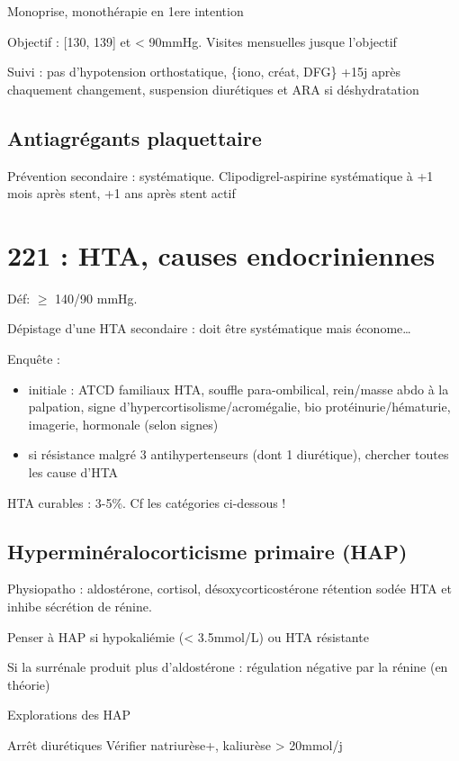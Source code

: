 \documentclass[11pt]{article}
\begin{document}
Monoprise, monothérapie en 1ere intention

Objectif : [130, 139] et < 90mmHg. Visites mensuelles jusque l'objectif

Suivi : pas d'hypotension orthostatique, \{iono, créat, DFG\} +15j après
chaquement changement, suspension diurétiques et ARA si déshydratation

\subsection{Antiagrégants plaquettaire}
\label{sec:org9f45f68}
Prévention secondaire : systématique. Clipodigrel-aspirine systématique à +1 mois
après stent, +1 ans après stent actif

\section{221 : HTA, causes endocriniennes}
\label{sec:org1f9e0af}
Déf: \(\ge\) 140/90 mmHg.

Dépistage d'une HTA secondaire : doit être systématique mais économe\ldots{}

Enquête :
\begin{itemize}
\item initiale : ATCD familiaux HTA, souffle para-ombilical, rein/masse abdo à la
palpation, signe d'hypercortisolisme/acromégalie, bio \thus
protéinurie/hématurie, imagerie, hormonale (selon signes)
\item si résistance malgré 3 antihypertenseurs (dont 1 diurétique), chercher toutes
les cause d'HTA
\end{itemize}

HTA curables : 3-5\%. Cf les catégories ci-dessous !

\subsection{Hyperminéralocorticisme primaire (HAP)}
\label{sec:org8506369}
Physiopatho : aldostérone, cortisol, désoxycorticostérone \thus rétention sodée
\thus HTA et inhibe sécrétion de rénine.

Penser à HAP si hypokaliémie (< 3.5mmol/L) ou HTA résistante

\begin{tcolorbox}
Si la surrénale produit plus d'aldostérone : régulation négative par la rénine (en théorie)
\end{tcolorbox}

\begin{algorithm}
  \caption{Explorations des HAP}
  Arrêt diurétiques\;
  Vérifier natriurèse+, kaliurèse > 20mmol/j\;
\end{algorithm}
\end{document}
